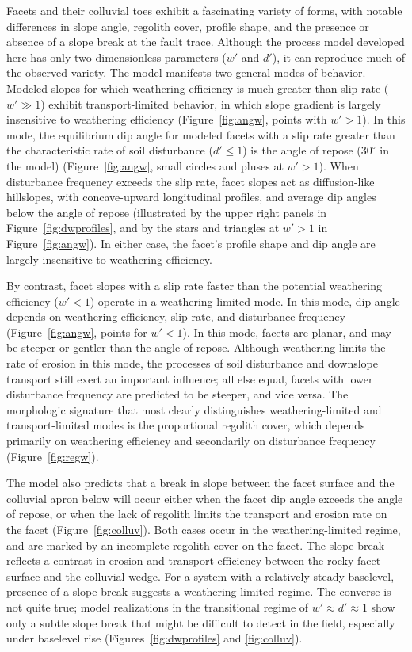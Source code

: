 Facets and their colluvial toes exhibit a fascinating variety of forms, with notable differences in slope angle, regolith cover, profile shape, and the presence or absence of a slope break at the fault trace. Although the process model developed here has only two dimensionless parameters ($w'$ and $d'$), it can reproduce much of the observed variety. The model manifests two general modes of behavior. Modeled slopes for which weathering efficiency is much greater than slip rate ($w' \gg 1$) exhibit transport-limited behavior, in which slope gradient is largely insensitive to weathering efficiency (Figure~\ref{fig:angw}, points with $w' > 1$). In this mode, the equilibrium dip angle for modeled facets with a slip rate greater than the characteristic rate of soil disturbance ($d' \le 1$) is the angle of repose ($30^\circ$ in the model) (Figure~\ref{fig:angw}, small circles and pluses at $w'>1$). When disturbance frequency exceeds the slip rate, facet slopes act as diffusion-like hillslopes, with concave-upward longitudinal profiles, and average dip angles below the angle of repose (illustrated by the upper right panels in Figure~\ref{fig:dwprofiles}, and by the stars and triangles at $w' > 1$ in Figure~\ref{fig:angw}). In either case, the facet's profile shape and dip angle are largely insensitive to weathering efficiency.

By contrast, facet slopes with a slip rate faster than the potential weathering efficiency ($w'<1$) operate in a weathering-limited mode. In this mode, dip angle depends on weathering efficiency, slip rate, and disturbance frequency (Figure~\ref{fig:angw}, points for $w'<1$). In this mode, facets are planar, and may be steeper or gentler than the angle of repose. Although weathering limits the rate of erosion in this mode, the processes of soil disturbance and downslope transport still exert an important influence; all else equal, facets with lower disturbance frequency are predicted to be steeper, and vice versa. The morphologic signature that most clearly distinguishes weathering-limited and transport-limited modes is the proportional regolith cover, which depends primarily on weathering efficiency and secondarily on disturbance frequency (Figure~\ref{fig:regw}).

The model also predicts that a break in slope between the facet surface and the colluvial apron below will occur either when the facet dip angle exceeds the angle of repose, or when the lack of regolith limits the transport and erosion rate on the facet (Figure~\ref{fig:colluv}).  Both cases occur in the weathering-limited regime, and are marked by an incomplete regolith cover on the facet. The slope break reflects a contrast in erosion and transport efficiency between the rocky facet surface and the colluvial wedge. For a system with a relatively steady baselevel, presence of a slope break suggests a weathering-limited regime. The converse is not quite true; model realizations in the transitional regime of $w'\approx d' \approx 1$ show only a subtle slope break that might be difficult to detect in the field, especially under baselevel rise (Figures~\ref{fig:dwprofiles} and \ref{fig:colluv}). 

